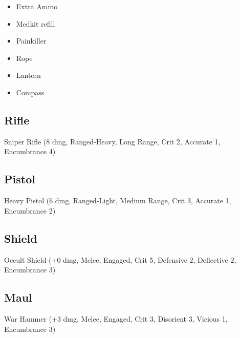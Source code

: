 \documentclass{book}
\begin{document}
\begin{multicols}{2}
\begin{itemize}
    \item Extra Ammo
    \item Medkit refill
    \item Painkiller
    \item Rope
    \item Lantern
    \item Compass
\end{itemize}

\subsection{Rifle}

Sniper Rifle (8 dmg, Ranged-Heavy, Long Range, Crit 2, Accurate 1, Encumbrance 4)

\subsection{Pistol}

Heavy Pistol (6 dmg, Ranged-Light, Medium Range, Crit 3, Accurate 1, Encumbrance 2)

\subsection{Shield}

Occult Shield (+0 dmg, Melee, Engaged, Crit 5, Defensive 2, Deflective 2, Encumbrance 3)

\subsection{Maul}

War Hammer (+3 dmg, Melee, Engaged, Crit 3, Disorient 3, Vicious 1, Encumbrance 3)

\end{multicols}
\end{document}
